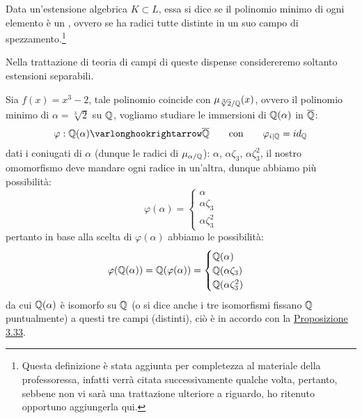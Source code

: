 \documentclass[11pt]{scrartcl}
\begin{document}
\begin{definition}
    Data un'estensione algebrica $K \subset L$, essa si dice  se il polinomio minimo di ogni elemento è un
    , ovvero se ha radici tutte distinte in un suo campo di spezzamento.\footnote{Questa definizione
    è stata aggiunta per completezza al materiale della professoressa, infatti verrà citata successivamente qualche volta, pertanto, sebbene non vi sarà una trattazione ulteriore 
    a riguardo, ho ritenuto opportuno aggiungerla qui.}
\end{definition}

Nella trattazione di teoria di campi di queste dispense considereremo soltanto estensioni separabili.

\begin{example}
    Sia $f(x) = x^3 - 2$, tale polinomio coincide con $\mu_{\sqrt[3]{2}/\mathbb Q}(x)$, ovvero il polinomio minimo di $\alpha = \sqrt[3]{2}$ su $\mathbb Q$, vogliamo studiare le immersioni di $\mathbb Q(\alpha)$ in $\overline {\mathbb Q}$:
    \[ \varphi : \QQ(\alpha) \varlonghookrightarrow \overline \QQ \qquad \text{con} \qquad \varphi_{i|\QQ} = id_\QQ
        \]
    dati i coniugati di $\alpha$ (dunque le radici di $\mu_{\alpha/\mathbb Q}$): $\alpha$, $\alpha\zeta_3$, $\alpha\zeta_3^2$, il nostro omomorfismo deve mandare ogni radice in un'altra, dunque abbiamo più possibilità:
    \[ \varphi(\alpha) = \begin{cases}
        \alpha \\
        \alpha\zeta_3 \\
         \alpha\zeta_3^2
        \end{cases}
        \]
    pertanto in base alla scelta di $\varphi(\alpha)$ abbiamo le possibilità:
    \[ \varphi(\mathbb Q(\alpha)) = \mathbb Q(\varphi(\alpha)) = \begin{cases}
        \mathbb Q(\alpha)\\
        \mathbb Q(\alpha\zeta_3)\\
        \mathbb Q(\alpha\zeta_3^2)\\
    \end{cases}
        \]
    da cui $\mathbb Q(\alpha)$ è isomorfo su $\mathbb Q$ (o si dice anche i tre isomorfismi fissano $\mathbb Q$ puntualmente) a questi tre campi (distinti), ciò è in accordo con la \hyperref[3.33]{Proposizione 3.33}.
\end{example}
\end{document}
